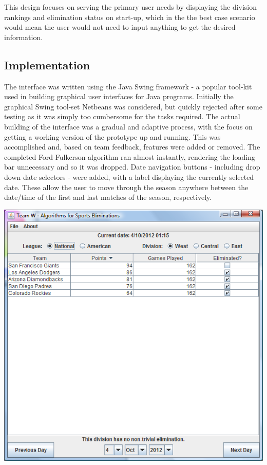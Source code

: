 This design focuses on serving the primary user needs by displaying the division
rankings and elimination status on start-up, which in the the best case scenario
would mean the user would not need to input anything to get the desired
information.

\subsection{Implementation}

The interface was written using the Java Swing framework - a popular tool-kit
used in building graphical user interfaces for Java programs. Initially the
graphical Swing tool-set Netbeans was considered, but quickly rejected after
some testing as it was simply too cumbersome for the tasks required.  The actual
building of the interface was a gradual and adaptive process, with the focus on
getting a working version of the  prototype up and running. This was
accomplished and, based on team feedback, features were added or removed. The
completed Ford-Fulkerson algorithm ran almost instantly, rendering the loading
bar unnecessary and so it was dropped. Date navigation buttons - including drop
down date selectors - were added, with a label displaying the currently selected
date. These  allow the user to move through the season anywhere between the
date/time of  the first and last matches of the season, respectively.

\includegraphics[width=0.9\linewidth,keepaspectratio]
{images/finalDesktopUI.png}


